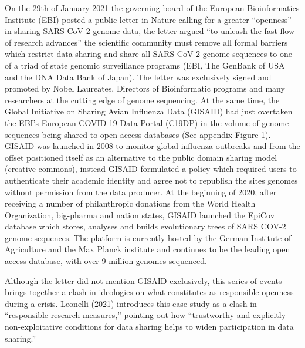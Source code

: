 \documentclass{article}
\begin{document}
On the 29th of January 2021 the governing board of the European
Bioinformatics Institute (EBI) posted a public letter in Nature calling
for a greater ``openness'' in sharing SARS-CoV-2 genome data, the letter
argued ``to unleash the fast flow of research advances'' the scientific
community must remove all formal barriers which restrict data sharing
and share all SARS-CoV-2 genome sequences to one of a triad of state
genomic surveillance programs (EBI, The GenBank of USA and the DNA Data
Bank of Japan). The letter was exclusively signed and promoted by Nobel
Laureates, Directors of Bioinformatic programs and many researchers at
the cutting edge of genome sequencing. At the same time, the Global
Initiative on Sharing Avian Influenza Data (GISAID) had just overtaken
the EBI's European COVID-19 Data Portal (C19DP) in the volume of genome
sequences being shared to open access databases (See appendix Figure 1).
GISAID was launched in 2008 to monitor global influenza outbreaks and
from the offset positioned itself as an alternative to the public domain
sharing model (creative commons), instead GISAID formulated a policy
which required users to authenticate their academic identity and agree
not to republish the sites genomes without permission from the data
producer. At the beginning of 2020, after receiving a number of
philanthropic donations from the World Health Organization, big-pharma
and nation states, GISAID launched the EpiCov database which stores,
analyses and builds evolutionary trees of SARS COV-2 genome sequences.
The platform is currently hosted by the German Institute of Agriculture
and the Max Planck institute and continues to be the leading open access
database, with over 9 million genomes sequenced.

Although the letter did not mention GISAID exclusively, this series of
events brings together a clash in ideologies on what constitutes as
responsible openness during a crisis. Leonelli (2021) introduces this
case study as a clash in ``responsible research measures,'' pointing out
how ``trustworthy and explicitly non-exploitative conditions for data
sharing helps to widen participation in data sharing.''
\end{document}
